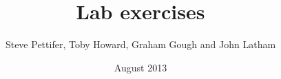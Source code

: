 \documentclass[11pt, a4paper]{report}
\title{Lab exercises}
\date{August 2013}
\author{Steve Pettifer, Toby Howard, Graham Gough and John Latham}
\begin{document}

\setcounter{chapter}{-1}
\renewcommand{\chaptername}{Welcome Lab Session}

\renewcommand{\chaptername}{Intro Lab Session}




\renewcommand{\chaptername}{COMP10120 Lab Session}
\setcounter{chapter}{0}






\printbibliography
\end{document}
